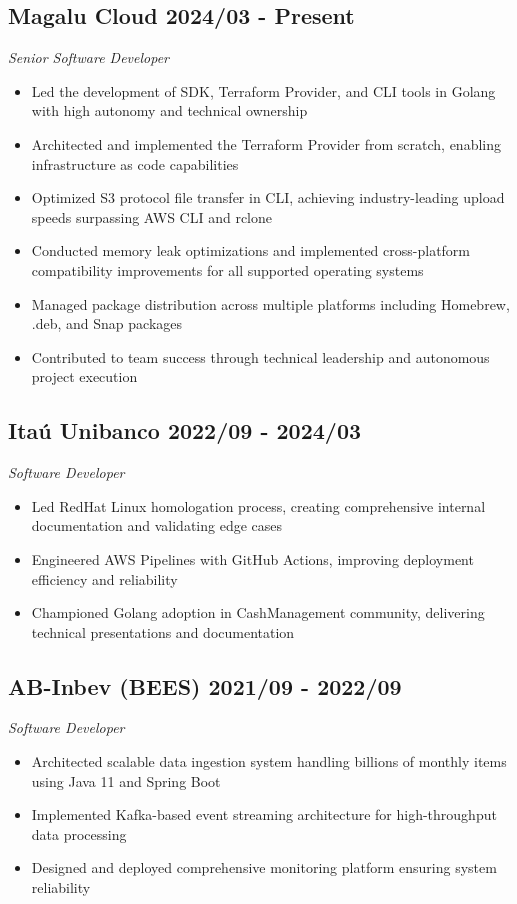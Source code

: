 \documentclass[a4paper,10pt]{article}
\begin{document}
\subsection*{\textcolor{primaryblue}{Magalu Cloud} \hfill 2024/03 - Present}
\textit{Senior Software Developer}
\begin{itemize}
    \item Led the development of SDK, Terraform Provider, and CLI tools in Golang with high autonomy and technical ownership
    \item Architected and implemented the Terraform Provider from scratch, enabling infrastructure as code capabilities
    \item Optimized S3 protocol file transfer in CLI, achieving industry-leading upload speeds surpassing AWS CLI and rclone
    \item Conducted memory leak optimizations and implemented cross-platform compatibility improvements for all supported operating systems
    \item Managed package distribution across multiple platforms including Homebrew, .deb, and Snap packages
    \item Contributed to team success through technical leadership and autonomous project execution
\end{itemize}

\subsection*{\textcolor{primaryblue}{Itaú Unibanco} \hfill 2022/09 - 2024/03}
\textit{Software Developer}
\begin{itemize}
    \item Led RedHat Linux homologation process, creating comprehensive internal documentation and validating edge cases
    \item Engineered AWS Pipelines with GitHub Actions, improving deployment efficiency and reliability
    \item Championed Golang adoption in CashManagement community, delivering technical presentations and documentation
\end{itemize}

\subsection*{\textcolor{primaryblue}{AB-Inbev (BEES)} \hfill 2021/09 - 2022/09}
\textit{Software Developer}
\begin{itemize}
    \item Architected scalable data ingestion system handling billions of monthly items using Java 11 and Spring Boot
    \item Implemented Kafka-based event streaming architecture for high-throughput data processing
    \item Designed and deployed comprehensive monitoring platform ensuring system reliability
\end{itemize}
\end{document}
